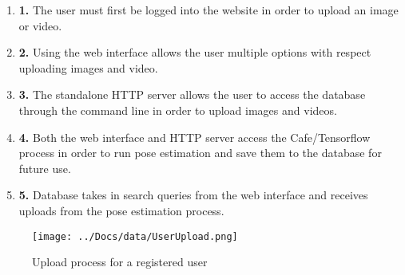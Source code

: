 \documentclass{scrreprt}
\begin{document}
\begin{enumerate}
  \item \textbf {1.} The user must first be logged into the website in order to upload an image or video.
  \item \textbf {2.} Using the web interface allows the user multiple options with respect uploading images and video.
  \item \textbf {3.} The standalone HTTP server allows the user to access the database through the command line in order to upload images and videos.
  \item \textbf {4.} Both the web interface and HTTP server access the Cafe/Tensorflow process in order to run pose estimation and save them to the database for future use.
  \item \textbf {5.} Database takes in search queries from the web interface and receives uploads from the pose estimation process.
\end{enumerate}


\begin{figure}[!ht]
        \caption{Upload process for a registered user}
        \label{mediaUpload}
        \centering
        \texttt{[image: ../Docs/data/UserUpload.png]}
\end{figure}
\end{document}
